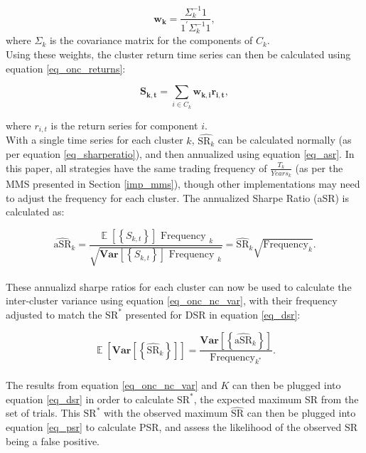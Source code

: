 \documentclass[a4paper,11pt,oneside]{article}
\newcommand{\Var}{\mathbf{Var}}
\DeclareMathOperator*{\E}{\mathbb{E}}
\theoremstyle{plain}
\theoremstyle{definition}
\begin{document}
	\begin{equation}\label{eq_onc_weights}
	\mathbf{w_{k}}=\frac{\Sigma_{k}^{-1} 1}{1^{\prime} \Sigma_{k}^{-1} 1}, 
	\end{equation}
		where $\Sigma_k$ is the covariance matrix for the components of $C_k$.\newline
	~\\
	Using these weights, the cluster return time series can then be calculated using equation \eqref{eq_onc_returns}:
	
	\begin{equation}\label{eq_onc_returns}
	\mathbf{S_{k, t}}=\sum_{i \in C_{k}} \mathbf{w_{k, i}} \mathbf{r_{i, t}}, 
	\end{equation}

	where $r_{i,t}$ is the return series for component $i$.\newline
	~\\
	With a single time series for each cluster $k$, $\widehat{\mathrm{SR}_k}$ can be calculated normally (as per equation \eqref{eq_sharperatio}), and then annualized using equation \eqref{eq_asr}. In this paper, all strategies have the same trading frequency of $\frac{T_k}{Years_k}$ (as per the MMS presented in Section \ref{imp_mms}), though other implementations may need to adjust the frequency for each cluster. The annualized Sharpe Ratio (aSR) is calculated as:
		
	\begin{equation}\label{eq_asr}
	\widehat{\mathrm{aSR}}_{k}=\frac{\mathrm{\E}\left[\left\{S_{k, t}\right\}\right] \text { Frequency }_{k}}{\sqrt{\mathrm{\Var}\left[\left\{S_{k, t}\right\}\right] \text { Frequency }_{k}}}=\widehat{\mathrm{SR}}_{k} \sqrt{\text {Frequency}_{k}} .
	\end{equation}
	~\\
	These annualizd sharpe ratios for each cluster can now be used to calculate the inter-cluster variance using equation \eqref{eq_onc_nc_var}, with their frequency adjusted to match the $\mathrm{SR}^*$ presented for DSR in equation \eqref{eq_dsr}:
		
	\begin{equation}\label{eq_onc_nc_var}
	\mathrm{\E}\left[\mathrm{\Var}\left[\left\{\widehat{\mathrm{SR}}_{k}\right\}\right]\right]=\frac{\mathrm{\Var}\left[\left\{\widehat{\mathrm{aSR}}_{k}\right\}\right]}{\text {Frequency}_{k^{*}}} .
	\end{equation}
	~\\
	The results from equation \eqref{eq_onc_nc_var} and $K$ can then be plugged into equation \eqref{eq_dsr} in order to calculate $\mathrm{SR}^*$, the expected maximum SR from the set of trials. This $\mathrm{SR}^*$ with the observed maximum $\widehat{\mathrm{SR}}$ can then be plugged into equation \eqref{eq_psr} to calculate PSR, and assess the likelihood of the observed $\widehat{\mathrm{SR}}$ being a false positive.
		
\end{document}
